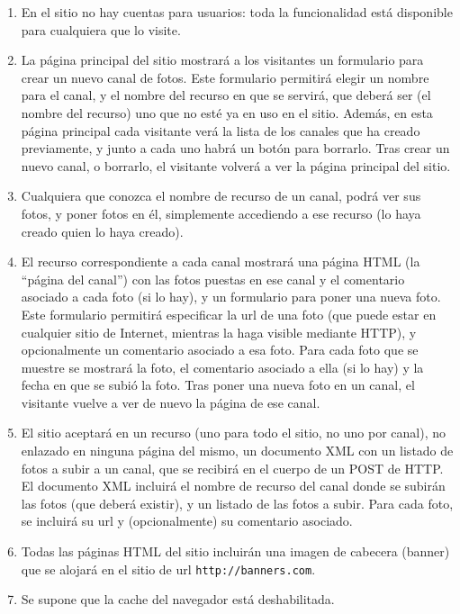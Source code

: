 {\begin{enumerate}
\item En el sitio no hay cuentas para usuarios: toda la funcionalidad está disponible para cualquiera que lo visite.
\item La página principal del sitio mostrará a los visitantes un formulario para crear un nuevo canal de fotos. Este formulario permitirá elegir un nombre para el canal, y el nombre del recurso en que se servirá, que deberá ser (el nombre del recurso) uno que no esté ya en uso en el sitio. Además, en esta página principal cada visitante verá la lista de los canales que ha creado previamente, y junto a cada uno habrá un botón para borrarlo. Tras crear un nuevo canal, o borrarlo, el visitante volverá a ver la página principal del sitio.
\item Cualquiera que conozca el nombre de recurso de un canal, podrá ver sus fotos, y poner fotos en él, simplemente accediendo a ese recurso (lo haya creado quien lo haya creado).
\item El recurso correspondiente a cada canal mostrará una página HTML (la ``página del canal'') con las fotos puestas en ese canal y el comentario asociado a cada foto (si lo hay), y un formulario para poner una nueva foto. Este formulario permitirá especificar la url de una foto (que puede estar en cualquier sitio de Internet, mientras la haga visible mediante HTTP), y opcionalmente un comentario asociado a esa foto. Para cada foto que se muestre se mostrará la foto, el comentario asociado a ella (si lo hay) y la fecha en que se subió la foto.
Tras poner una nueva foto en un canal, el visitante vuelve a ver de nuevo la página de ese canal.
\item El sitio aceptará en un recurso (uno para todo el sitio, no uno por canal), no enlazado en ninguna página del mismo, un documento XML con un listado de fotos a subir a un canal, que se recibirá en el cuerpo de un POST de HTTP. El documento XML incluirá el nombre de recurso del canal donde se subirán las fotos (que deberá existir), y un listado de las fotos a subir. Para cada foto, se incluirá su url y (opcionalmente) su comentario asociado.
\item Todas las páginas HTML del sitio incluirán una imagen de cabecera (banner) que se alojará en el sitio de url \verb|http://banners.com|.

\item Se supone que la cache del navegador está deshabilitada.
\end{enumerate}

}
